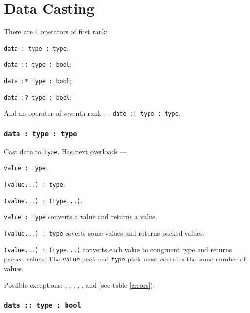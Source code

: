 \section{Data Casting}

There are 4 operators of first rank:
\begin{icItems}
	\item \texttt{data : type : type};
	\item \texttt{data :: type : bool};
	\item \texttt{data :* type : bool};
	\item \texttt{data :? type : bool};
\end{icItems}

And an operator of seventh rank — \texttt{date :! type : type}.

\subsubsection{\texttt{data : type : type}}

Cast data to \texttt{type}. Has next overloads —
\begin{icItems}
	\item \texttt{value : type}.
	\item \texttt{(value...) : type}.
	\item \texttt{(value...) : (type...)}.
\end{icItems}

\texttt{value : type} converts a value and returns a value.

\texttt{(value...) : type} coverts some values and returns packed values.

\texttt{(value...) : (type...)} converts each value to congruent type and returns packed values. The \texttt{value} pack and \texttt{type} pack must contains the same number of values.

Possible exceptions: , , , , ,  and  (see table \ref{errors}).

\subsubsection{\texttt{data :: type : bool}}

